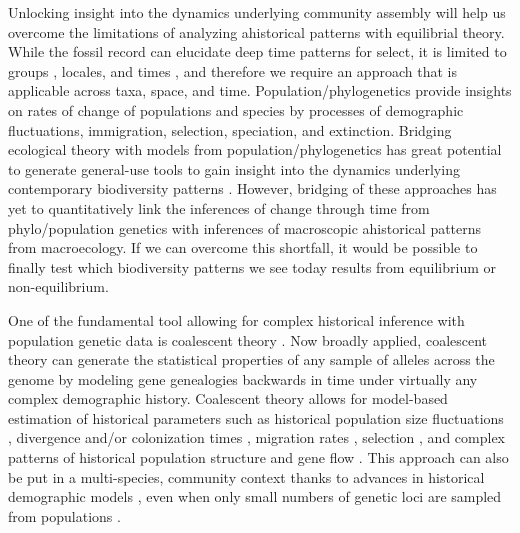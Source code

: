 \documentclass[12pt]{article}
\begin{document}
Unlocking insight into the dynamics underlying community assembly will
help us overcome the limitations of analyzing ahistorical patterns
with equilibrial theory. While the fossil record can elucidate deep
time patterns for select,  it is limited to  groups \citep{Alroy2008-no}, locales, and times \citep{Harnik2011-qe}, and therefore we require an approach that is
applicable across taxa, space, and
time. Population/phylogenetics provide insights on rates of change of
populations and species by processes of demographic fluctuations,
immigration, selection, speciation, and extinction. Bridging
ecological theory with models from population/phylogenetics has great
potential to generate general-use tools to gain insight into the dynamics
underlying contemporary biodiversity patterns \citep{Webb2002-yr,
  Emerson2002-mw, Lavergne2010-ts, Li2016-ns, McGaughran2015-sy,
  Laroche2015-qo, Vanoverbeke2015-ym, Vellend2005-qd,
  Papadopoulou2011-bd,Dexter2012-rn}. However, bridging of these approaches has
yet to quantitatively link the inferences of change through time from
phylo/population genetics with inferences of macroscopic ahistorical
patterns from macroecology.  If we can overcome this shortfall, it would be possible to
finally test which biodiversity patterns we see today results from
equilibrium or non-equilibrium.

One of the fundamental tool allowing for complex historical inference
with population genetic data is coalescent theory
\citep{Hudson1983-hx, Tajima1983-me, Kingman1982-uf, Kingman1982-ie,
  Rosenberg2002-ag}.  Now broadly applied, coalescent theory can
generate the statistical properties of any sample of alleles across
the genome by modeling gene genealogies backwards in time under
virtually any complex demographic history.  Coalescent theory allows for model-based
estimation of historical parameters such as historical population size
fluctuations \citep{Kuhner1998-dp, Slatkin1991-ec}, divergence and/or
colonization times \citep{Charlesworth2010-hn, Edwards2000-cs},
migration rates \citep{Wakeley2008-se}, selection \citep{Kim2002-ex, Kern2016-ap, Ewing2016-bm}, and complex patterns of
historical population structure \citep{Prado-Martinez2013-hv,
  Bahlo2000-cx} and gene flow \citep{Beerli2001-mt,Hey2004-xe}. This
approach can also be put in a multi-species, community context thanks
to advances in historical demographic models \citep{Xue2015-el,
  Hickerson2006-uf, Carstens2016-mc, Chan2014-nq, Satler2016-lb}, even
when only small numbers of genetic loci are sampled from populations
\citep{Drummond2005-zh}.
\end{document}
